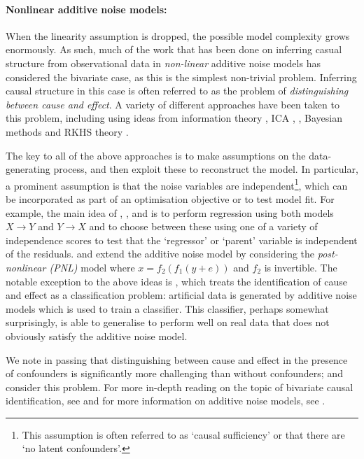\paragraph{Nonlinear additive noise models:}
When the linearity assumption is dropped, the possible model complexity grows enormously. As such, much of the work that has been done on inferring casual structure from observational data in \emph{non-linear} additive noise models has considered the bivariate case, as this is the simplest non-trivial problem. Inferring causal structure in this case is often referred to as the problem of \emph{distinguishing between cause and effect}. A variety of different approaches have been taken to this problem, including using ideas from information theory \cite{janzing2012information} \cite{janzing2010causal} \cite{janzing2009telling}, ICA \cite{hyvarinen2013pairwise}, \cite{zhang2008distinguishing}, Bayesian methods \cite{mooij2010distinguishing} \cite{stegle2010probabilistic} and RKHS theory \cite{lopez2015towards}.

The key to all of the above approaches is to make assumptions on the data-generating process, and then exploit these to reconstruct the model. In particular, a prominent assumption is that the noise variables are independent\footnote{This assumption is often referred to as `causal sufficiency' or that there are `no latent confounders'.}, which can be incorporated as part of an optimisation objective or to test model fit. For example, the main idea of \cite{hoyer2009nonlinear}, \cite{peters2014causal}, \cite{peters2010identifying} and \cite{mooij2010distinguishing} is to perform regression using both models $X \longrightarrow Y$ and $Y \longrightarrow X$ and to choose between these using one of a variety of independence scores to test that the `regressor' or `parent' variable is independent of the residuals. \cite{zhang2008distinguishing} and \cite{zhang2009identifiability} extend the additive noise model by considering the \emph{post-nonlinear (PNL)} model where $x = f_2(f_1(y+e))$ and $f_2$ is invertible. The notable exception to the above ideas is \cite{lopez2015towards}, which treats the identification of cause and effect as a classification problem: artificial data is generated by additive noise models which is used to train a classifier. This classifier, perhaps somewhat surprisingly, is able to generalise to perform well on real data that does not obviously satisfy the additive noise model.

We note in passing that distinguishing between cause and effect in the presence of confounders is significantly more challenging than without confounders; \cite{hoyer2008estimation} and \cite{janzing2009identifying} consider this problem.  For more in-depth reading on the topic of bivariate causal identification, see \cite{mooij2014distinguishing} and for more information on additive noise models, see \cite{peters2014causal}.


